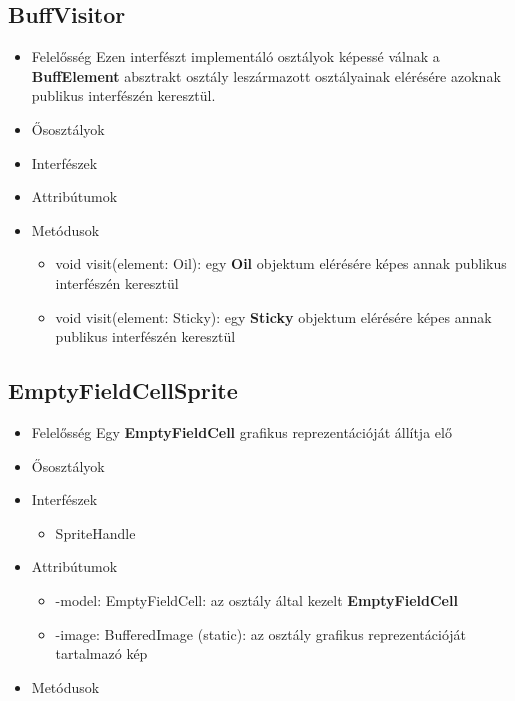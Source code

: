 \subsection{BuffVisitor}
\begin{itemize}
\item Felelősség \newline
    Ezen interfészt implementáló osztályok képessé válnak a \textbf{BuffElement} absztrakt osztály leszármazott osztályainak elérésére azoknak publikus interfészén keresztül.
\item Ősosztályok
\item Interfészek
\item Attribútumok
\item Metódusok
	\begin{itemize}
        \item void visit(element: Oil): egy \textbf{Oil} objektum elérésére képes annak publikus interfészén keresztül
        \item void visit(element: Sticky): egy \textbf{Sticky} objektum elérésére képes annak publikus interfészén keresztül
	\end{itemize}
\end{itemize}

\subsection{EmptyFieldCellSprite}
\begin{itemize}
\item Felelősség \newline
    Egy \textbf{EmptyFieldCell} grafikus reprezentációját állítja elő
\item Ősosztályok
\item Interfészek
    \begin{itemize}
        \item SpriteHandle
    \end{itemize}
\item Attribútumok
    \begin{itemize}
        \item -model: EmptyFieldCell: az osztály által kezelt \textbf{EmptyFieldCell}
        \item -image: BufferedImage (static): az osztály grafikus reprezentációját tartalmazó kép
    \end{itemize}
\item Metódusok
\end{itemize}

